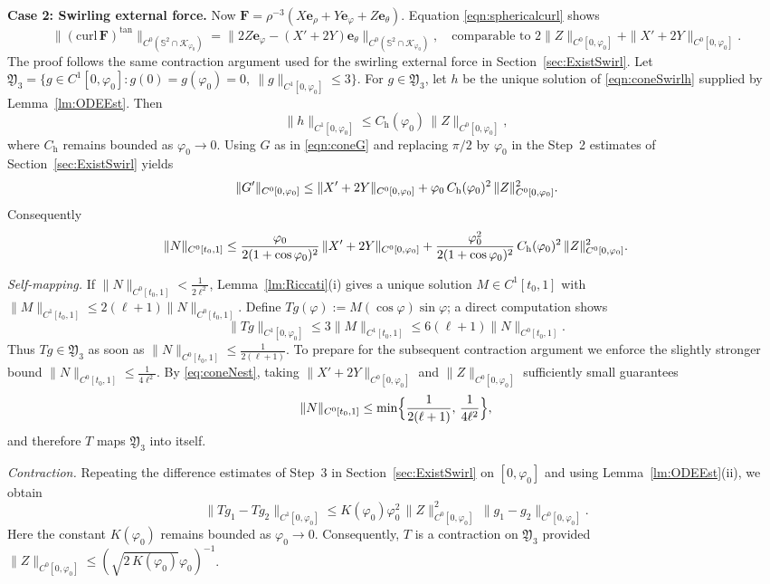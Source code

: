 \documentclass{amsart}
\newcommand{\curl}{\mathrm{curl}}
\newcommand{\vp}{\varphi}
\newcommand{\Be}{{\boldsymbol{e}}}
\newcommand{\BF}{{\boldsymbol{F}}}
\begin{document}
\noindent\textbf{Case 2: Swirling external force.}
Now $\BF=\rho^{-3}(X\Be_\rho+Y\Be_\varphi+Z\Be_\theta)$. Equation \eqref{eqn:sphericalcurl} shows
\[
\|(\curl\,\BF)^{\tan}\|_{C^0(\mathbb{S}^{2}\cap\mathcal{K}_{\varphi_0})} = \bigl\|2Z\Be_{\varphi} - (X'+2Y)\Be_{\theta}\bigr\|_{C^0(\mathbb{S}^2 \cap \mathcal{K}_{\varphi_0})},\quad \text{comparable to }2\|Z\|_{C^0[0,\varphi_0]} + \|X'+2Y\|_{C^0[0,\varphi_0]}.
\]
The proof follows the same contraction argument used for the swirling external force in Section~\ref{sec:ExistSwirl}.
Let
$\mathfrak{Y}_3 = \{ g\in C^1[0,\varphi_0] : g(0)=g(\varphi_0)=0,\ \|g\|_{C^1[0,\varphi_0]}\le 3 \}$.
For $g\in\mathfrak{Y}_3$, let $h$ be the unique solution of \eqref{eqn:coneSwirlh} supplied by Lemma~\ref{lm:ODEEst}. Then
\[
\|h\|_{C^1[0,\varphi_0]} \le C_{\mathrm{h}}(\varphi_0)\,\|Z\|_{C^0[0,\varphi_0]},
\]
where $C_{\mathrm{h}}$ remains bounded as $\varphi_0\to0$.
Using $G$ as in \eqref{eqn:coneG} and replacing $\pi/2$ by $\varphi_0$ in the Step~2 estimates of Section~\ref{sec:ExistSwirl} yields
\[
\|G'\|_{C^0[0,\varphi_0]} \le \|X'+2Y\|_{C^0[0,\varphi_0]} + \varphi_0\,C_{\rm h}(\varphi_0)^2\,\|Z\|_{C^0[0,\varphi_0]}^{2}.
\]
Consequently
\begin{equation}\label{eq:coneNest}
\|N\|_{C^0[t_0,1]} \le \frac{\varphi_0}{2(1+\cos\varphi_0)^{2}}\,\|X'+2Y\|_{C^0[0,\varphi_0]}
+ \frac{\varphi_0^{2}}{2(1+\cos\varphi_0)^{2}}\,C_{\rm h}(\varphi_0)^2\,\|Z\|_{C^0[0,\varphi_0]}^{2}.
\end{equation}

\emph{Self-mapping.}  
If $\|N\|_{C^0[t_0,1]}<\frac{1}{2\ell^{2}}$, Lemma~\ref{lm:Riccati}(i) gives a unique solution $M\in C^1[t_0,1]$ with $\|M\|_{C^1[t_0,1]}\le 2(\ell+1)\|N\|_{C^0[t_0,1]}$.  
Define $Tg(\varphi):=M(\cos\varphi)\sin\varphi$; a direct computation shows
\[
\|Tg\|_{C^1[0,\vp_0]}\le 3\|M\|_{C^1[t_0,1]}\le 6(\ell+1)\|N\|_{C^0[t_0,1]}.
\]
Thus $Tg\in\mathfrak{Y}_3$ as soon as $\|N\|_{C^0[t_0,1]}\le \frac{1}{2(\ell+1)}$.  
To prepare for the subsequent contraction argument we enforce the slightly stronger bound $\|N\|_{C^0[t_0,1]}\le\frac{1}{4\ell^{2}}$.  
By \eqref{eq:coneNest}, taking $\|X'+2Y\|_{C^0[0,\vp_0]}$ and $\|Z\|_{C^0[0,\vp_0]}$ sufficiently small guarantees
\[
\|N\|_{C^0[t_0,1]}\le \min\Bigl\{\frac{1}{2(\ell+1)},\,\frac{1}{4\ell^{2}}\Bigr\},
\]
and therefore $T$ maps $\mathfrak{Y}_3$ into itself.

\emph{Contraction.}  Repeating the difference estimates of Step~3 in Section~\ref{sec:ExistSwirl} on $[0,\varphi_0]$ and using Lemma~\ref{lm:ODEEst}(ii), we obtain
\[
\|Tg_1-Tg_2\|_{C^1[0,\vp_0]} \le K(\vp_0)\varphi_0^{2}\,\|Z\|_{C^0[0,\vp_0]}^{2}\,\|g_1-g_2\|_{C^0[0,\vp_0]}.
\]
Here the constant $K(\vp_0)$ remains bounded as $\varphi_0\to0$. Consequently, $T$ is a contraction on $\mathfrak{Y}_3$ provided $\|Z\|_{C^0[0,\varphi_0]} \le  (\sqrt{2\,K(\varphi_0)} \vp_0)^{-1}$.
\end{document}
